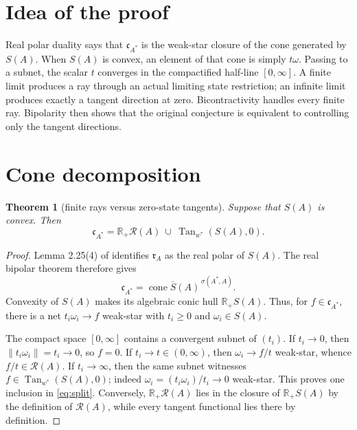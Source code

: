 \documentclass[11pt]{article}
\newtheorem{theorem}{Theorem}
\newcommand{\R}{\mathbb R}
\newcommand{\rA}{\mathfrak r_A}
\newcommand{\cA}{\mathfrak c_{A^*}}
\newcommand{\Tan}{\operatorname{Tan}_{w^*}}
\begin{document}
\section*{Idea of the proof}
Real polar duality says that $\cA$ is the weak-star closure of the cone
generated by $S(A)$.  When $S(A)$ is convex, an element of that cone is simply
$t\omega$.  Passing to a subnet, the scalar $t$ converges in the compactified
half-line $[0,\infty]$.  A finite limit produces a ray through an actual
limiting state restriction; an infinite limit produces exactly a tangent
direction at zero.  Bicontractivity handles every finite ray.  Bipolarity then
shows that the original conjecture is equivalent to controlling only the
tangent directions.

\section*{Cone decomposition}
\begin{theorem}[finite rays versus zero-state tangents]\label{thm:split}
Suppose that $S(A)$ is convex.  Then
\begin{equation}\label{eq:split}
 \cA=\R_+\mathcal R(A)\ \cup\ \Tan(S(A),0).
\end{equation}
\end{theorem}

\begin{proof}
Lemma 2.25(4) of \cite{Source} identifies $\rA$ as the real polar of
$S(A)$.  The real bipolar theorem therefore gives
\[
 \cA=\overline{\operatorname{cone}S(A)}^{\,\sigma(A^*,A)}.
\]
Convexity of $S(A)$ makes its algebraic conic hull $\R_+S(A)$.  Thus, for
$f\in\cA$, there is a net $t_i\omega_i\to f$ weak-star with $t_i\geq0$ and
$\omega_i\in S(A)$.

The compact space $[0,\infty]$ contains a convergent subnet of $(t_i)$.
If $t_i\to0$, then
$\|t_i\omega_i\|=t_i\to0$, so $f=0$.  If $t_i\to t\in(0,\infty)$, then
$\omega_i\to f/t$ weak-star, whence $f/t\in\mathcal R(A)$.  If
$t_i\to\infty$, then the same subnet witnesses
$f\in\Tan(S(A),0)$; indeed $\omega_i=(t_i\omega_i)/t_i\to0$ weak-star.
This proves one inclusion in \eqref{eq:split}.  Conversely,
$\R_+\mathcal R(A)$ lies in the closure of $\R_+S(A)$ by the definition of
$\mathcal R(A)$, while every tangent functional lies there by definition.
\end{proof}
\end{document}
